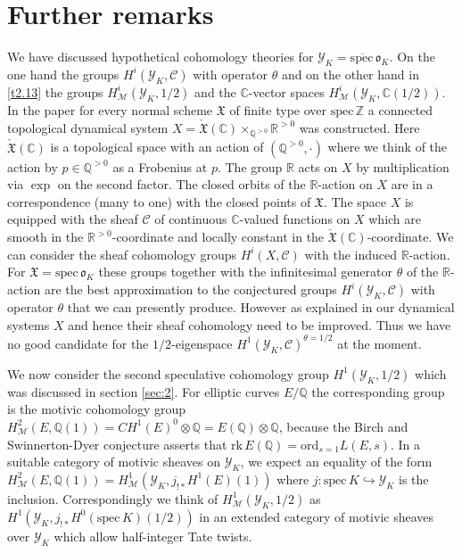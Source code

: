 \documentclass[12pt,leqno]{article}
\newcommand{\C}{{\mathbb{C}}}
\newcommand{\Q}{{\mathbb{Q}}}
\newcommand{\R}{{\mathbb{R}}}
\newcommand{\Z}{{\mathbb{Z}}}
\newcommand{\ord}{\mathrm{ord}}
\newcommand{\rk}{\mathrm{rk}\,}
\newcommand{\spec}{\mathrm{spec}\,}
\newcommand{\Ch}{{\mathcal C}}
\newcommand{\Mh}{{\mathcal M}}
\newcommand{\Yh}{\mathcal{Y}}
\newcommand{\eo}{\mathfrak{o}}
\newcommand{\eX}{{\mathfrak X}}
\newcommand{\ceX}{\check{\eX}}
\begin{document}
\section{Further remarks} \label{sec:4}

We have discussed hypothetical cohomology theories for $\Yh_K = \overline{\spec} \eo_K$. On the one hand the groups $H^i (\Yh_K , \Ch)$ with operator $\theta$ and on the other hand in \ref{t2.13} the groups $H^i_{\Mh} (\Yh_K , 1/2)$ and the $\C$-vector spaces $H^i_{\Mh} (\Yh_K , \C (1/2))$. In the paper \cite{D1} for every normal scheme $\eX$ of finite type over $\spec \Z$ a connected topological dynamical system $X = \ceX (\C) \times_{\Q^{> 0}} \R^{> 0}$ was constructed. Here $\ceX (\C)$ is a topological space with an action of $(\Q^{> 0} , \cdot)$ where we think of the action by $p \in \Q^{> 0}$ as a Frobenius at $p$. The group $\R$ acts on $X$ by multiplication via $\exp$ on the second factor. The closed orbits of the $\R$-action on $X$ are in a correspondence (many to one) with the closed points of $\eX$. The space $X$ is equipped with the sheaf $\Ch$ of continuous $\C$-valued functions on $X$ which are smooth in the $\R^{> 0}$-coordinate and locally constant in the $\ceX (\C)$-coordinate. We can consider the sheaf cohomology groups $H^i (X , \Ch)$ with the induced $\R$-action. For $\eX = \spec \eo_K$ these groups together with the infinitesimal generator $\theta$ of the $\R$-action are the best approximation to the conjectured groups $H^i (\Yh_K , \Ch)$ with operator $\theta$ that we can presently produce. However as explained in \cite{D1} our dynamical systems $X$ and hence their sheaf cohomology need to be improved. Thus we have no good candidate for the $1 / 2$-eigenspace $H^1 (\Yh_K , \Ch)^{\theta = 1/2}$ at the moment. 

We now consider the second speculative cohomology group $H^1 (\Yh_K , 1/2)$ which was discussed in section \ref{sec:2}. For elliptic curves $E / \Q$ the corresponding group is the motivic cohomology group $H^2_{\Mh} (E , \Q (1)) = CH^1 (E)^0 \otimes \Q = E (\Q) \otimes \Q$, because the Birch and Swinnerton-Dyer conjecture asserts that $\rk E (\Q) = \ord_{s = 1} L (E,s)$. In a suitable category of motivic sheaves on $\Yh_K$, we expect an equality of the form $H^2_{\Mh} (E , \Q (1)) = H^1_{\Mh} (\Yh_K , j_{!*} H^1 (E) (1))$ where $j : \spec K \hookrightarrow \Yh_K$ is the inclusion. Correspondingly we think of $H^1_{\Mh} (\Yh_K , 1/2)$ as $H^1 (\Yh_K , j_{!*} H^0 (\spec K) (1/2))$ in an extended category of motivic sheaves over $\Yh_K$ which allow half-integer Tate twists. 
\end{document}
